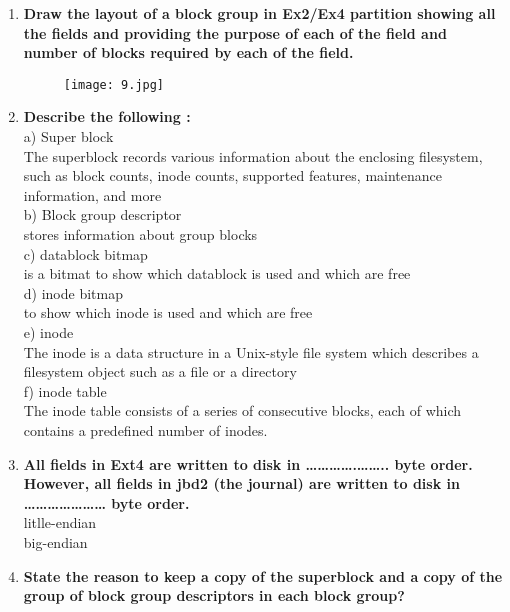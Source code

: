 \documentclass[a4paper,12pt]{article}
\begin{document}
\begin{flushleft}
\begin{enumerate}
{11.handling of transparentaly compressed and encrypted files\\
12.logical deletion\\
13.journaling}\\
\item \textbf{ Draw the layout of a block group in Ex2/Ex4 partition showing all the fields and providing the purpose of each of the field and number of blocks required by each of the field.}\\
\begin{figure}[H]
 \centering
  \texttt{[image: 9.jpg]}
  \label{fig:10}
\end{figure}
\item \textbf{ Describe the following :}\\
a) Super block\\
{\color{red}The superblock records various information
about the enclosing filesystem, such as block
counts, inode counts, supported features,
maintenance information, and more
}\\
 b) Block group descriptor\\
 {\color{red}stores information about group blocks}\\
 c) datablock bitmap\\
 {\color{red}is a bitmat to show which datablock is used and which are free}\\
d) inode bitmap \\
{\color{red}to show which inode is used and which are free}\\
e) inode\\
{\color{red}The inode is a data structure in a Unix-style file
system which describes a filesystem object such as a
file or a directory
}\\
 f) inode table\\
 {\color{red}The inode table consists of a series of consecutive blocks, each
of which contains a predefined number of inodes.
}\\
\item \textbf{ All fields in Ext4 are written to disk in ………….…….. byte order. However, all fields in jbd2 (the journal) are written to disk in ………………… byte order.}\\
{\color{red}litlle-endian\\
big-endian}\\
\item \textbf{ State the reason to keep a copy of the superblock and a copy of the group of block group descriptors in each block group?}\\

\end{enumerate}
\end{flushleft}
\end{document}
